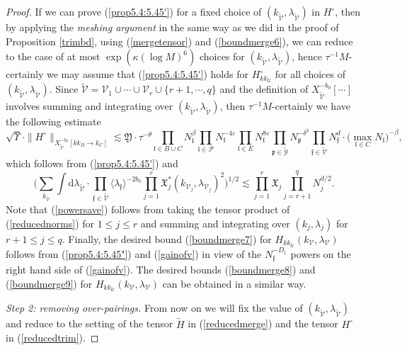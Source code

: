 \documentclass[11 pt,reqno]{amsart}
\theoremstyle{definition}
\theoremstyle{remark}
\numberwithin{equation}{section}
\newcommand{\Pc}{\mathcal{P}}
\newcommand{\Uc}{\mathcal{U}}
\newcommand{\Vc}{\mathcal{V}}
\newcommand{\Yc}{\mathcal{Y}}
\newcommand{\pf}{\mathfrak{p}}
\newcommand{\ff}{\mathfrak{f}}
\newcommand{\Xf}{\mathfrak{X}}
\newcommand{\lf}{\mathfrak{l}}
\newcommand{\Yf}{\mathfrak{Y}}
\begin{document}
{\begin{proof}
If we can prove (\ref{prop5.4:5.45'}) for a fixed choice of $(k_{\widetilde{\Vc}}, \lambda_{\widetilde{\Vc}})$ in $H^{\circ}$, then by applying the \emph{meshing argument} in the same way as we did in the proof of Proposition \ref{trimbd}, using (\ref{mergetensor}) and (\ref{boundmerge6}), we can reduce to the case of at most $\exp(\kappa(\log M)^6)$ choices for $(k_{\widetilde{\Vc}},\lambda_{\widetilde{\Vc}})$, hence $\tau^{-1}M$-certainly we may assume that (\ref{prop5.4:5.45'}) holds for $H_{kk_\Uc}^\circ$ for all choices of $(k_{\widetilde{\Vc}},\lambda_{\widetilde{\Vc}})$. Since $\widetilde{\Vc}=\Vc_1\cup\cdots\cup\Vc_r\cup\{r+1,\cdots,q\}$ and the definition of $X_{\widetilde{\Vc}}^{-b_0}[\cdots]$ involves summing and integrating over $(k_{\widetilde{\Vc}}, \lambda_{\widetilde{\Vc}})$, then $\tau^{-1}M$-certainly we have the following estimate 
\begin{equation}\label{prop5.4:5.45"}
\sqrt{\Upsilon}\cdot\|H^\circ\|_{X_{\widetilde{\Vc}}^{-b_0}[kk_{B}\to k_{C}]}\lesssim\Yf\cdot\tau^{-\theta}\prod_{\lf\in B\cup C}N_\lf^\beta\prod_{\lf\in\Pc}N_\lf^{-4\varepsilon}\prod_{\lf\in E}N_\lf^{8\varepsilon}\prod_{\pf\in\widetilde{\Yc}}N_\pf^{-\delta^3} \prod_{\ff \in \widetilde{\Vc}} N_\ff^d\cdot \big(\max_{\lf\in C}N_\lf\big)^{-\beta},
\end{equation}
which follows from (\ref{prop5.4:5.45'}) and
\begin{equation}\label{powersave}\bigg(\sum_{k_{\widetilde{\Vc}}}\int\mathrm{d}\lambda_{\widetilde{\Vc}}\cdot\prod_{\ff\in\widetilde{\Vc}}\langle\lambda_\ff\rangle^{-2b_0}\prod_{j=1}^r\Xf_j^*(k_{\Vc_j},\lambda_{\Vc_j})^2\bigg)^{1/2}\lesssim\prod_{j=1}^r\Xf_j\prod_{j=r+1}^q N_j^{d/2}.\end{equation} Note that (\ref{powersave}) follows from taking the tensor product of (\ref{reducednorms}) for $1\leq j\leq r$ and summing and integrating over $(k_j,\lambda_j)$ for $r+1\leq j\leq q$.
Finally, the desired bound (\ref{boundmerge7}) for $H_{kk_\Uc}(k_\Vc,\lambda_\Vc)$ follows from (\ref{prop5.4:5.45"}) and (\ref{gainofv}) in view of the $N_\ff^{-D_1}$ powers on the right hand side of (\ref{gainofv}). 
The desired bounds (\ref{boundmerge8}) and (\ref{boundmerge9}) for $H_{kk_\Uc}(k_\Vc,\lambda_\Vc)$ can be obtained in a similar way.

\emph{Step 2: removing over-pairings.} From now on we will fix the value of $(k_{\widetilde{\Vc}},\lambda_{\widetilde{\Vc}})$ and reduce to the setting of the tensor $\widetilde{H}$ in (\ref{reducedmerge}) and the tensor $H^\circ$ in (\ref{reducedtrim}).


\end{proof}}
\end{document}
